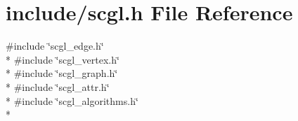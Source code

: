 \section{include/scgl.h File Reference}
\label{scgl_8h}
{\ttfamily \#include \char`\"{}scgl\-\_\-edge.\-h\char`\"{}}\\*
{\ttfamily \#include \char`\"{}scgl\-\_\-vertex.\-h\char`\"{}}\\*
{\ttfamily \#include \char`\"{}scgl\-\_\-graph.\-h\char`\"{}}\\*
{\ttfamily \#include \char`\"{}scgl\-\_\-attr.\-h\char`\"{}}\\*
{\ttfamily \#include \char`\"{}scgl\-\_\-algorithms.\-h\char`\"{}}\\*
